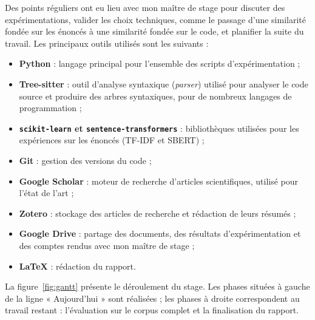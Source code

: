 \documentclass[12pt,a4paper,oneside]{report}
\begin{document}
Des points réguliers ont eu lieu avec mon maître de stage pour discuter des
expérimentations, valider les choix techniques, comme le passage d'une
similarité fondée sur les énoncés à une similarité fondée sur le code, et
planifier la suite du travail. Les principaux outils utilisés sont les
suivants :
\begin{itemize}
    \item \textbf{Python} : langage principal pour l'ensemble des scripts
    d'expérimentation ;
    \item \textbf{Tree-sitter} : outil d'analyse syntaxique (\emph{parser})
    utilisé pour analyser le code source et produire des arbres
    syntaxiques, pour de nombreux langages de programmation ;
    \item \textbf{\texttt{scikit-learn} et \texttt{sentence-transformers}} :
    bibliothèques utilisées pour les expériences sur les énoncés (TF-IDF
    et SBERT) ;
    \item \textbf{Git} : gestion des versions du code ;
    \item \textbf{Google Scholar} : moteur de recherche d'articles
    scientifiques, utilisé pour l'état de l'art ;
    \item \textbf{Zotero} : stockage des articles de recherche et rédaction de leurs résumés ;
    \item \textbf{Google Drive} : partage des documents, des résultats
    d'expérimentation et des comptes rendus avec mon maître de stage ;
    \item \textbf{\LaTeX} : rédaction du rapport.
\end{itemize}

La figure~\ref{fig:gantt} présente le déroulement du stage. Les phases
situées à gauche de la ligne « Aujourd'hui » sont réalisées ; les phases à
droite correspondent au travail restant : l'évaluation sur le corpus
complet et la finalisation du rapport.
\end{document}
